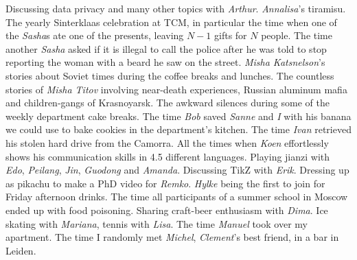 Discussing data privacy and many other topics with \emph{Arthur}. \emph{Annalisa}'s tiramisu. The yearly Sinterklaas celebration at TCM, in particular the time when one of the \emph{Sasha}s ate one of the presents, leaving $N-1$ gifts for $N$ people. The time another \emph{Sasha} asked if it is illegal to call the police after he was told to stop reporting the woman with a beard he saw on the street. \emph{Misha Katsnelson}'s stories about Soviet times during the coffee breaks and lunches. The countless stories of \emph{Misha Titov} involving near-death experiences, Russian aluminum mafia and children-gangs of Krasnoyarsk. The awkward silences during some of the weekly department cake breaks. The time \emph{Bob} saved \emph{Sanne} and \emph{I} with his banana we could use to bake cookies in the department's kitchen. 
The time \emph{Ivan} retrieved his stolen hard drive from the Camorra. All the times when \emph{Koen} effortlessly shows his communication skills in 4.5 different languages. Playing jianzi with \emph{Edo}, \emph{Peilang}, \emph{Jin}, \emph{Guodong} and \emph{Amanda}. Discussing TikZ with \emph{Erik}. 
Dressing up as pikachu to make a PhD video for \emph{Remko}. \emph{Hylke} being the first to join for Friday afternoon drinks. The time all participants of a summer school in Moscow ended up with food poisoning. Sharing craft-beer enthusiasm with \emph{Dima}. Ice skating with \emph{Mariana}, tennis with \emph{Lisa}. The time \emph{Manuel} took over my apartment. The time I randomly met \emph{Michel}, \emph{Clement}'s best friend, in a bar in Leiden.  

